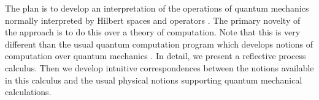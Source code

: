 

The plan is to develop an interpretation of the operations of quantum
mechanics normally interpreted by Hilbert spaces and operators
\cite{von1955mathematical}. The primary novelty of the approach
is to do this over a theory of computation. Note that this is very
different than the usual quantum computation program which develops
notions of computation over quantum mechanics \cite{9781107002173}. In
detail, we present a reflective process calculus. Then we develop
intuitive correspondences between the notions available in this
calculus and the usual physical notions supporting quantum mechanical
calculations.

